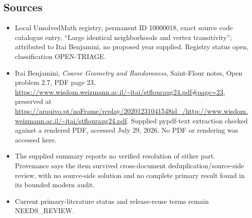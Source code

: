 \documentclass[11pt]{article}
\begin{document}
\subsection{Sources}
\begin{itemize}
\item Local UnsolvedMath registry, permanent ID 10000018, exact source code catalogue entry, ``Large identical neighborhoods and vertex transitivity''; attributed to Itai Benjamini, no proposed year supplied. Registry status open, classification OPEN-TRIAGE.
\item Itai Benjamini, \emph{Coarse Geometry and Randomness}, Saint-Flour notes, Open problem 2.7, PDF page 23, \url{https://www.wisdom.weizmann.ac.il/~itai/stflouraug24.pdf#page=23}, preserved at \url{https://arquivo.pt/noFrame/replay/20201231041548id_/http://www.wisdom.weizmann.ac.il/~itai/stflouraug24.pdf}. Supplied pypdf-text extraction checked against a rendered PDF, accessed July 29, 2026. No PDF or rendering was accessed here.
\item The supplied summary reports no verified resolution of either part. Provenance says the item survived cross-document deduplication/source-side review, with no source-side solution and no complete primary result found in its bounded modern audit.
\item Current primary-literature status and release-reuse terms remain NEEDS\_REVIEW.
\end{itemize}
\end{document}
